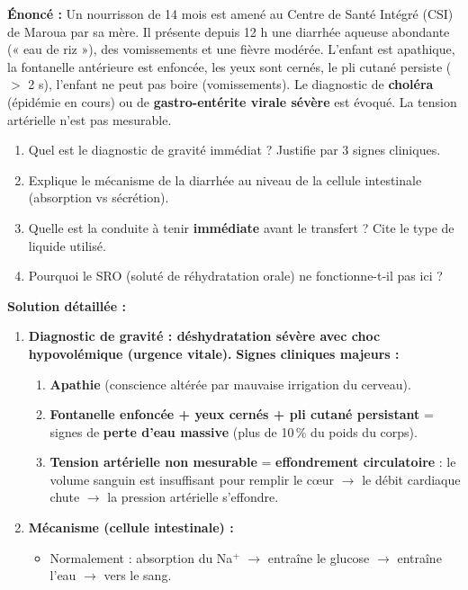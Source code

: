 \documentclass[11pt]{article}
\newcommand{\cle}[1]{{\popxbold\color{popdark}#1}}
\begin{document}
\begin{exoresolu}
    \textbf{Énoncé :} Un nourrisson de 14 mois est amené au Centre de Santé Intégré (CSI) de Maroua par sa mère. Il présente depuis 12 h une diarrhée aqueuse abondante (« eau de riz »), des vomissements et une fièvre modérée. L'enfant est apathique, la fontanelle antérieure est enfoncée, les yeux sont cernés, le pli cutané persiste ($>$ 2 s), l'enfant ne peut pas boire (vomissements). Le diagnostic de \textbf{choléra} (épidémie en cours) ou de \textbf{gastro-entérite virale sévère} est évoqué. La tension artérielle n'est pas mesurable.
    \begin{enumerate}
        \item Quel est le diagnostic de gravité immédiat ? Justifie par 3 signes cliniques.
        \item Explique le mécanisme de la diarrhée au niveau de la cellule intestinale (absorption vs sécrétion).
        \item Quelle est la conduite à tenir \textbf{immédiate} avant le transfert ? Cite le type de liquide utilisé.
        \item Pourquoi le SRO (soluté de réhydratation orale) ne fonctionne-t-il pas ici ?
    \end{enumerate}
    \tcblower
    \textbf{Solution détaillée :}
    \begin{enumerate}
        \item \textbf{Diagnostic de gravité : \cle{déshydratation sévère avec choc hypovolémique} (urgence vitale).}
            \textbf{Signes cliniques majeurs :}
            \begin{enumerate}
                \item \textbf{Apathie} (conscience altérée par mauvaise irrigation du cerveau).
                \item \textbf{Fontanelle enfoncée + yeux cernés + pli cutané persistant} = signes de \textbf{perte d'eau massive} (plus de 10\,\% du poids du corps).
                \item \textbf{Tension artérielle non mesurable} = \textbf{effondrement circulatoire} : le volume sanguin est insuffisant pour remplir le cœur $\rightarrow$ le débit cardiaque chute $\rightarrow$ la pression artérielle s'effondre.
            \end{enumerate}
        \item \textbf{Mécanisme (cellule intestinale) :}
            \begin{itemize}
                \item Normalement : absorption du Na$^+$ $\rightarrow$ entraîne le glucose $\rightarrow$ entraîne l'eau $\rightarrow$ vers le sang.

\end{itemize}
\end{enumerate}
\end{exoresolu}
\end{document}
